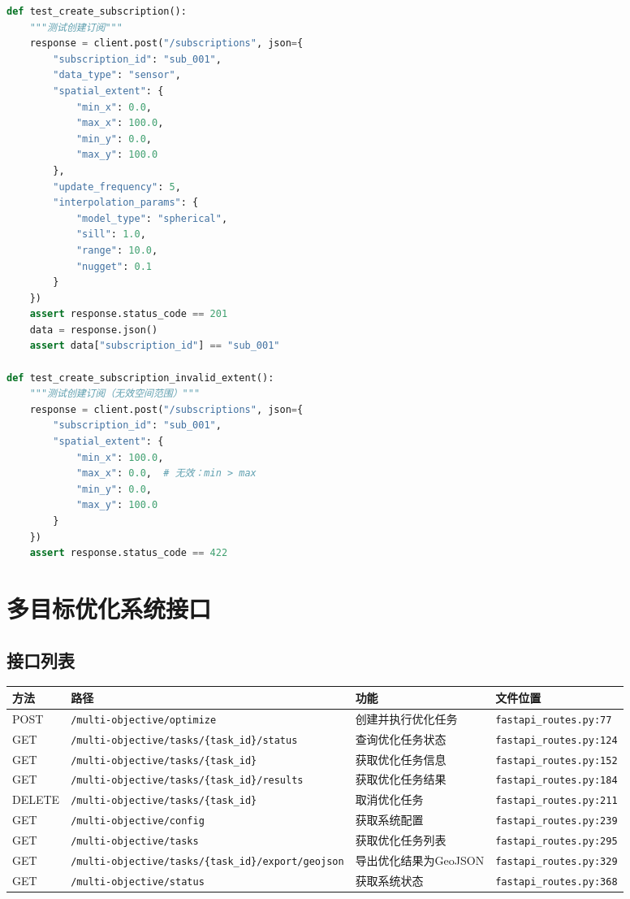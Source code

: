 \documentclass[12pt,a4paper,openany]{report}
\begin{document}
\begin{lstlisting}[language=Python, caption=创建订阅测试]
def test_create_subscription():
    """测试创建订阅"""
    response = client.post("/subscriptions", json={
        "subscription_id": "sub_001",
        "data_type": "sensor",
        "spatial_extent": {
            "min_x": 0.0,
            "max_x": 100.0,
            "min_y": 0.0,
            "max_y": 100.0
        },
        "update_frequency": 5,
        "interpolation_params": {
            "model_type": "spherical",
            "sill": 1.0,
            "range": 10.0,
            "nugget": 0.1
        }
    })
    assert response.status_code == 201
    data = response.json()
    assert data["subscription_id"] == "sub_001"

def test_create_subscription_invalid_extent():
    """测试创建订阅（无效空间范围）"""
    response = client.post("/subscriptions", json={
        "subscription_id": "sub_001",
        "spatial_extent": {
            "min_x": 100.0,
            "max_x": 0.0,  # 无效：min > max
            "min_y": 0.0,
            "max_y": 100.0
        }
    })
    assert response.status_code == 422
\end{lstlisting}

\section{多目标优化系统接口}

\subsection{接口列表}

\begin{longtable}{|l|l|l|l|}
\hline
\textbf{方法} & \textbf{路径} & \textbf{功能} & \textbf{文件位置} \\
\hline
\endhead
POST & \texttt{/multi-objective/optimize} & 创建并执行优化任务 & \texttt{fastapi\_routes.py:77} \\
GET & \texttt{/multi-objective/tasks/\{task\_id\}/status} & 查询优化任务状态 & \texttt{fastapi\_routes.py:124} \\
GET & \texttt{/multi-objective/tasks/\{task\_id\}} & 获取优化任务信息 & \texttt{fastapi\_routes.py:152} \\
GET & \texttt{/multi-objective/tasks/\{task\_id\}/results} & 获取优化任务结果 & \texttt{fastapi\_routes.py:184} \\
DELETE & \texttt{/multi-objective/tasks/\{task\_id\}} & 取消优化任务 & \texttt{fastapi\_routes.py:211} \\
GET & \texttt{/multi-objective/config} & 获取系统配置 & \texttt{fastapi\_routes.py:239} \\
GET & \texttt{/multi-objective/tasks} & 获取优化任务列表 & \texttt{fastapi\_routes.py:295} \\
GET & \texttt{/multi-objective/tasks/\{task\_id\}/export/geojson} & 导出优化结果为GeoJSON & \texttt{fastapi\_routes.py:329} \\
GET & \texttt{/multi-objective/status} & 获取系统状态 & \texttt{fastapi\_routes.py:368} \\
\hline
\end{longtable}
\end{document}
